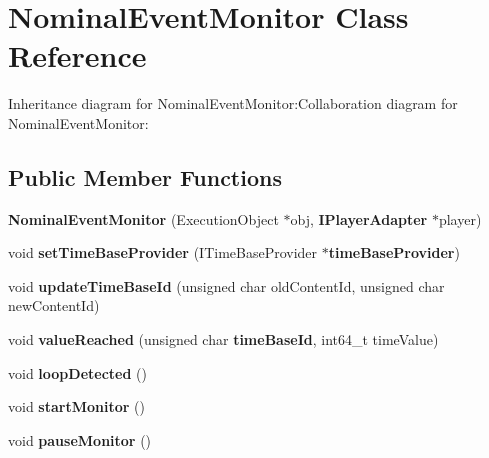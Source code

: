 \section{NominalEventMonitor Class Reference}
\label{classbr_1_1pucrio_1_1telemidia_1_1ginga_1_1ncl_1_1adapters_1_1NominalEventMonitor}
Inheritance diagram for NominalEventMonitor:Collaboration diagram for NominalEventMonitor:\subsection*{Public Member Functions}
\begin{CompactItemize}
\item 
\textbf{NominalEventMonitor} (ExecutionObject $\ast$obj, {\bf IPlayerAdapter} $\ast$player)\label{classbr_1_1pucrio_1_1telemidia_1_1ginga_1_1ncl_1_1adapters_1_1NominalEventMonitor_0b4371e77b66d9c0b01d7218a0f03fed}

\item 
void \textbf{setTimeBaseProvider} (ITimeBaseProvider $\ast${\bf timeBaseProvider})\label{classbr_1_1pucrio_1_1telemidia_1_1ginga_1_1ncl_1_1adapters_1_1NominalEventMonitor_5a671c0102c7b736e7e0e78e50f9922c}

\item 
void \textbf{updateTimeBaseId} (unsigned char oldContentId, unsigned char newContentId)\label{classbr_1_1pucrio_1_1telemidia_1_1ginga_1_1ncl_1_1adapters_1_1NominalEventMonitor_c5c13786881f1a0751baa0252cb7a691}

\item 
void \textbf{valueReached} (unsigned char {\bf timeBaseId}, int64\_\-t timeValue)\label{classbr_1_1pucrio_1_1telemidia_1_1ginga_1_1ncl_1_1adapters_1_1NominalEventMonitor_29a4e949da2298777d8144e4c93d32b6}

\item 
void \textbf{loopDetected} ()\label{classbr_1_1pucrio_1_1telemidia_1_1ginga_1_1ncl_1_1adapters_1_1NominalEventMonitor_a0a322e549d5d724be072f5bc3666354}

\item 
void \textbf{startMonitor} ()\label{classbr_1_1pucrio_1_1telemidia_1_1ginga_1_1ncl_1_1adapters_1_1NominalEventMonitor_1f39b73fee753fc2e3533adeef6b9172}

\item 
void \textbf{pauseMonitor} ()\label{classbr_1_1pucrio_1_1telemidia_1_1ginga_1_1ncl_1_1adapters_1_1NominalEventMonitor_46d7fb9a2cc5a37df100f19997ca3208}


\end{CompactItemize}
